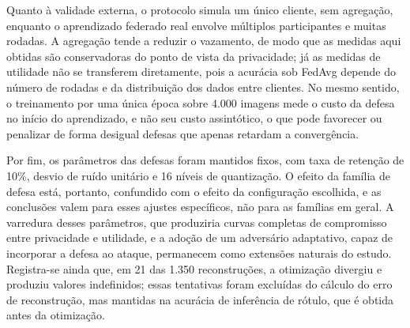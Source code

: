Quanto à validade externa, o protocolo simula um único cliente, sem agregação, enquanto o aprendizado federado real envolve múltiplos participantes e muitas rodadas. A agregação tende a reduzir o vazamento, de modo que as medidas aqui obtidas são conservadoras do ponto de vista da privacidade; já as medidas de utilidade não se transferem diretamente, pois a acurácia sob FedAvg depende do número de rodadas e da distribuição dos dados entre clientes. No mesmo sentido, o treinamento por uma única época sobre 4.000 imagens mede o custo da defesa no início do aprendizado, e não seu custo assintótico, o que pode favorecer ou penalizar de forma desigual defesas que apenas retardam a convergência.

Por fim, os parâmetros das defesas foram mantidos fixos, com taxa de retenção de 10\%, desvio de ruído unitário e 16 níveis de quantização. O efeito da família de defesa está, portanto, confundido com o efeito da configuração escolhida, e as conclusões valem para esses ajustes específicos, não para as famílias em geral. A varredura desses parâmetros, que produziria curvas completas de compromisso entre privacidade e utilidade, e a adoção de um adversário adaptativo, capaz de incorporar a defesa ao ataque, permanecem como extensões naturais do estudo. Registra-se ainda que, em 21 das 1.350 reconstruções, a otimização divergiu e produziu valores indefinidos; essas tentativas foram excluídas do cálculo do erro de reconstrução, mas mantidas na acurácia de inferência de rótulo, que é obtida antes da otimização.
